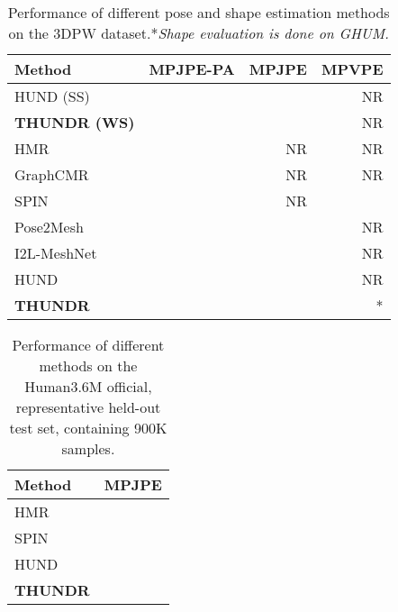 \documentclass[10pt,twocolumn,letterpaper]{article}
\begin{document}
\begin{table}[!htbp]
    \small
    \centering
    \begin{tabular}[t]{|l||r|r|r|}
    \hline
    \textbf{Method}  & {MPJPE-PA} & {MPJPE} & {MPVPE} \\ 
    \hline
    \hline
    HUND \cite{zanfir2020neural} (SS) &  &  & NR\\
    \textbf{THUNDR (WS)} &  &  &NR \\
    \hline
    \hline
    HMR \cite{Kanazawa2018} &  & NR &NR\\
    \hline
    GraphCMR \cite{kolotouros2019convolutional} &  &NR &NR\\
    \hline
    SPIN \cite{kolotouros2019learning} &  &NR & \\
    \hline
    Pose2Mesh \cite{choi2020pose2mesh} &  & &NR\\
    \hline
    I2L-MeshNet \cite{moon2020MeshNet} &  &  &NR\\
    \hline
    HUND \cite{zanfir2020neural} &  &  & NR\\
\hline
\textbf{THUNDR} &  &  & * \\
    \hline
    \end{tabular}
    \vspace{-3mm}
    \caption{\small Performance of different pose and shape estimation methods on the 3DPW dataset.*\textit{Shape evaluation is done on GHUM.}}
\label{tbl:3DPW}
\end{table}

\begin{table}[!htbp]
    \small
    \centering
    \begin{tabular}[t]{|l||r|}
    \hline
    \textbf{Method}  & {MPJPE}\\ 
    \hline
    \hline
    HMR \cite{Kanazawa2018} & \\
    \hline
    SPIN \cite{kolotouros2019learning} &  \\
    \hline
    HUND \cite{zanfir2020neural} &  \\
    \hline
    \textbf{THUNDR} &  \\
    \hline
    \end{tabular}
    \vspace{-3mm}
    \caption{\small Performance of different methods on the Human3.6M official, representative held-out test set, containing 900K samples. }
\label{tbl:H36MOfficial}
\end{table}

\vspace{-4mm}
\end{document}
